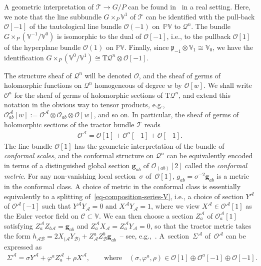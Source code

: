 \documentclass[pdftex]{sigma}
\numberwithin{equation}{section}
\newcommand{\mc} [1]{\mathcal{#1}}
\newcommand{\Tgt} {\mathrm{T}}
\newcommand{\mfp} {\mathfrak{p}}
\newcommand{\Pp} {\mathbb{P}}
\newcommand{\V} {\mathbb{V}}
\begin{document}
A geometric interpretation of $\mc{T} \rightarrow G/P$ can be found in~\cite{Curry2014} in a real setting. Here, we note that the line subbundle $G \times_P \V^1$ of $\mc{T}$ can be identif\/ied with the pull-back $\mc{O}[-1]$ of the tautological line bundle $\mc{O}(-1)$ on~$\Pp\V$ to $\mc{Q}^n$. The bundle $G \times_P \left( \V^{-1}/\V^0 \right)$ is isomorphic to the dual of $\mc{O}[-1]$, i.e., to the pullback $\mc{O}[1]$ of the hyperplane bundle $\mc{O}(1)$ on $\Pp \V$. Finally, since $\mfp_{-1} \otimes \V_1 \cong \V_0$, we have the identif\/ication $G \times_P \left( \V^0/ \V^1 \right) \cong \Tgt \mc{Q}^n \otimes \mc{O}[-1]$.

The structure sheaf of $\mc{Q}^n$ will be denoted $\mc{O}$, and the sheaf of germs of holomorphic functions on $\mc{Q}^n$ homogeneous of degree $w$ by $\mc{O}[w]$. We shall write $\mc{O}^a$ for the sheaf of germs of holomorphic sections of $\Tgt \mc{Q}^n$, and extend this notation in the obvious way to tensor products, e.g., $\mc{O}^{\mc{A}}_{ab}[w] := \mc{O}^{\mc{A}} \otimes \mc{O}_{ab} \otimes \mc{O}[w]$, and so on. In particular, the sheaf of germs of holomorphic sections of the tractor bundle $\mc{T}$ reads
\begin{gather}\label{eq-composition-series-V}
\mc{O}^\mc{A} = \mc{O}[1] + \mc{O}^a[-1] + \mc{O}[-1] .
\end{gather}
The line bundle $\mc{O}[1]$ has the geometric interpretation of the bundle of \emph{conformal scales}, and the conformal structure on $\mc{Q}^n$ can be equivalently encoded in terms of a distinguished global section $\mathbf{g}_{ab}$ of $\mc{O}_{(ab)}[2]$ called the \emph{conformal metric}. For any non-vanishing local section~$\sigma$ of~$\mc{O}[1]$, $g_{ab}=\sigma^{-2} \mathbf{g}_{ab}$ is a metric in the conformal class. A choice of metric in the conformal class is essentially equivalently to a splitting of~\eqref{eq-composition-series-V}, i.e., a choice of section $Y^\mc{A}$ of $\mc{O}^\mc{A} [-1]$ such that $Y^\mc{A} Y_\mc{A} =0$ and $X^\mc{A} Y_\mc{A} = 1$, where we view $X^\mc{A} \in \mc{O}^\mc{A} [1]$ as the Euler vector f\/ield on $\mc{C} \subset \V$. We can then choose a section $Z_a^\mc{A}$ of $\mc{O}^\mc{A}_a[1]$ satisfying $Z_a^\mc{A} Z_{b \mc{A}} = \mathbf{g}_{ab}$ and $Z_a^\mc{A} X_\mc{A} = Z_a^\mc{A} Y_\mc{A} = 0$, so that the tractor metric takes the form $h_{\mc{A} \mc{B}} = 2 X_{(\mc{A}} Y_{\mc{B})} + Z_\mc{A}^a Z_\mc{B}^b \mathbf{g}_{ab}$~-- see, e.g.,~\cite{Gover2008}. A~sec\-tion~$\Sigma^\mc{A}$ of~$\mc{O}^\mc{A}$ can be expressed as
\begin{gather}\label{eq-split-tractor}
\Sigma^\mc{A} = \sigma Y^\mc{A} + \varphi^a Z_a^\mc{A} + \rho X^\mc{A} , \qquad \text{where} \quad (\sigma,\varphi^a,\rho) \in \mc{O}[1] \oplus \mc{O}^a[-1] \oplus \mc{O}[-1].
\end{gather}
\end{document}
